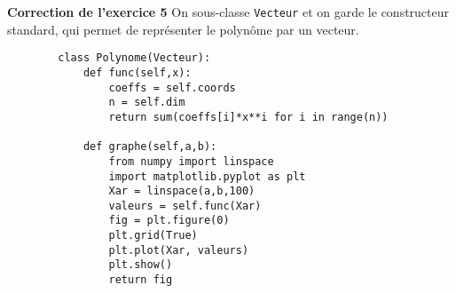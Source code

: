 \begin{frame}[fragile]
	\begin{block}{\textbf{Correction de l'exercice 5}}
	On sous-classe \lstinline|Vecteur| et on garde le constructeur standard, qui permet de représenter le polynôme par un vecteur.
	\begin{lstlisting}
		class Polynome(Vecteur):
			def func(self,x):
				coeffs = self.coords
				n = self.dim
				return sum(coeffs[i]*x**i for i in range(n))
			
			def graphe(self,a,b):
				from numpy import linspace
				import matplotlib.pyplot as plt
				Xar = linspace(a,b,100)
				valeurs = self.func(Xar)
				fig = plt.figure(0)
				plt.grid(True)
				plt.plot(Xar, valeurs)
				plt.show()
				return fig
	\end{lstlisting}
	\end{block}
\end{frame}

